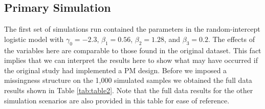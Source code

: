 \documentclass{svjour3}\usepackage[]{graphicx}\usepackage[]{color}
\begin{document}
\subsection{Primary Simulation}
\label{sec:3.1}
The first set of simulations run contained the parameters in the random-intercept logistic model with $\gamma_0 = -2.3$, $\beta_1 = 0.56$, $\beta_2 = 1.28$, and $\beta_3 = 0.2$. The effects of the variables here are comparable to those found in the original dataset. This fact implies that we can interpret the results here to show what may have occurred if the original study had implemented a PM design. Before we imposed a missingness structure on the 1,000 simulated samples we obtained the full data results shown in Table \ref{tab:table2}. Note that the full data results for the other simulation scenarios are also provided in this table for ease of reference.
\end{document}
